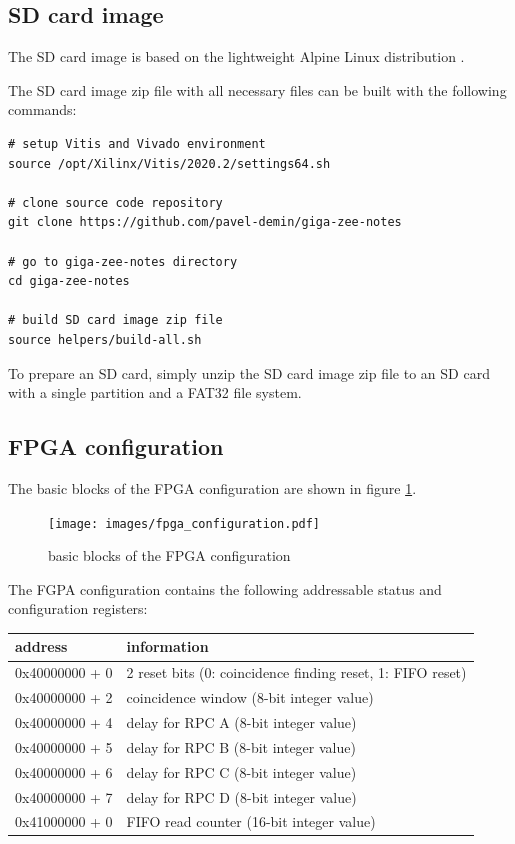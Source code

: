 \documentclass[12pt, a4paper]{article}
\begin{document}
\subsection{SD card image}

The SD card image is based on the lightweight Alpine Linux distribution \cite{alpine}.

The SD card image zip file with all necessary files can be built with the following commands:
\vspace{-1ex}
\begin{verbatim}
# setup Vitis and Vivado environment
source /opt/Xilinx/Vitis/2020.2/settings64.sh

# clone source code repository
git clone https://github.com/pavel-demin/giga-zee-notes

# go to giga-zee-notes directory
cd giga-zee-notes

# build SD card image zip file
source helpers/build-all.sh
\end{verbatim}

To prepare an SD card, simply unzip the SD card image zip file to an SD card with a single partition and a FAT32 file system.

\subsection{FPGA configuration}

The basic blocks of the FPGA configuration are shown in figure \ref{fig:fpga_configuration}.

\begin{figure}[h!]
  \centering
  \texttt{[image: images/fpga\_configuration.pdf]}
  \caption{basic blocks of the FPGA configuration}
  \label{fig:fpga_configuration}
\end{figure}

The FGPA configuration contains the following addressable status and configuration registers:
\begin{center}
  \begin{tabular}{|l|l|}
  \hline
  \textbf{address} & \textbf{information} \\
  \hline
  0x40000000 + 0 & 2 reset bits (0: coincidence finding reset, 1: FIFO reset) \\
  \hline
  0x40000000 + 2 & coincidence window (8-bit integer value) \\
  \hline
  0x40000000 + 4 & delay for RPC A (8-bit integer value) \\
  \hline
  0x40000000 + 5 & delay for RPC B (8-bit integer value) \\
  \hline
  0x40000000 + 6 & delay for RPC C (8-bit integer value) \\
  \hline
  0x40000000 + 7 & delay for RPC D (8-bit integer value) \\
  \hline
  0x41000000 + 0 & FIFO read counter (16-bit integer value) \\
  \hline
  \end{tabular}
\end{center}
\end{document}
